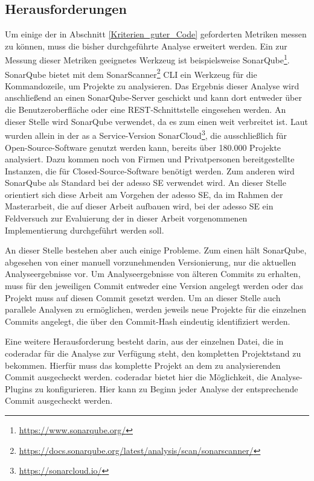 \documentclass[
	oneside,  %
	ngerman, 
	final, 
	11pt, 
	a4paper, 
	1.1headlines, 
	headinclude=false, 
	footinclude=false, 
	mpinclude=false, 
	pagesize, 
	onecolumn, 
	titlepage, 
	parskip=half, 
	headsepline, 
	chapterprefix=false, 
	version=first, 
	listof=totoc, 
	bibliography=totoc, 
	toc=graduated, 
	fleqn
]{scrbook}
\begin{document}
\subsection{Herausforderungen}
\label{Herausforderungen}
Um einige der in Abschnitt \ref{Kriterien_guter_Code} geforderten Metriken messen zu können, muss die bisher durchgeführte Analyse erweitert werden.
Ein zur Messung dieser Metriken geeignetes Werkzeug ist beispielsweise SonarQube\footnote{\url{https://www.sonarqube.org/}}.
SonarQube bietet mit dem SonarScanner\footnote{\url{https://docs.sonarqube.org/latest/analysis/scan/sonarscanner/}} \acf{CLI} ein Werkzeug für die Kommandozeile, um Projekte zu analysieren.
Das Ergebnis dieser Analyse wird anschließend an einen SonarQube-Server geschickt und kann dort entweder über die Benutzeroberfläche oder eine \acs{REST}-Schnittstelle eingesehen werden. 
An dieser Stelle wird SonarQube verwendet, da es zum einen weit verbreitet ist.
Laut \cite{SC2021} wurden allein in der \glqq as a Service\grqq{}-Version SonarCloud\footnote{\url{https://sonarcloud.io/}}, die ausschließlich für Open-Source-Software genutzt werden kann, bereits über 180.000 Projekte analysiert.
Dazu kommen noch von Firmen und Privatpersonen bereitgestellte Instanzen, die für Closed-Source-Software benötigt werden.
Zum anderen wird SonarQube als Standard bei der adesso SE verwendet wird.
An dieser Stelle orientiert sich diese Arbeit am Vorgehen der adesso SE, da im Rahmen der Masterarbeit, die auf dieser Arbeit aufbauen wird, bei der adesso SE ein Feldversuch zur Evaluierung der in dieser Arbeit vorgenommenen Implementierung durchgeführt werden soll.

An dieser Stelle bestehen aber auch einige Probleme.
Zum einen hält SonarQube, abgesehen von einer manuell vorzunehmenden Versionierung, nur die aktuellen Analyseergebnisse vor.
Um Analyseergebnisse von älteren Commits zu erhalten, muss für den jeweiligen Commit entweder eine Version angelegt werden oder das Projekt muss auf diesen Commit gesetzt werden.
Um an dieser Stelle auch parallele Analysen zu ermöglichen, werden jeweils neue Projekte für die einzelnen Commits angelegt, die über den Commit-Hash eindeutig identifiziert werden.

Eine weitere Herausforderung besteht darin, aus der einzelnen Datei, die in coderadar für die Analyse zur Verfügung steht, den kompletten Projektstand zu bekommen.
Hierfür muss das komplette Projekt an dem zu analysierenden Commit ausgecheckt werden.
coderadar bietet hier die Möglichkeit, die Analyse-Plugins zu konfigurieren.
Hier kann zu Beginn jeder Analyse der entsprechende Commit ausgecheckt werden.
\end{document}
